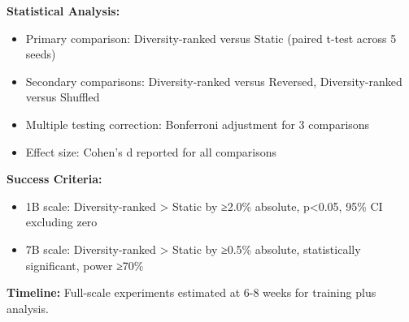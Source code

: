 \textbf{Statistical Analysis:}
\begin{itemize}
\item Primary comparison: Diversity-ranked versus Static (paired t-test across 5 seeds)
\item Secondary comparisons: Diversity-ranked versus Reversed, Diversity-ranked versus Shuffled
\item Multiple testing correction: Bonferroni adjustment for 3 comparisons
\item Effect size: Cohen's d reported for all comparisons
\end{itemize}

\textbf{Success Criteria:}
\begin{itemize}
\item 1B scale: Diversity-ranked > Static by ≥2.0\% absolute, p<0.05, 95\% CI excluding zero
\item 7B scale: Diversity-ranked > Static by ≥0.5\% absolute, statistically significant, power ≥70\%
\end{itemize}

\textbf{Timeline:} Full-scale experiments estimated at 6-8 weeks for training plus analysis.
